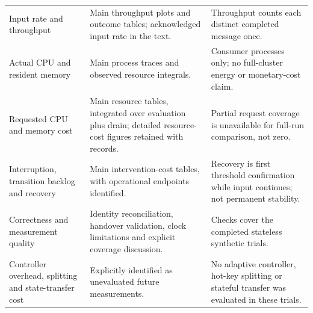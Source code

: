 \begin{longtable}{@{}>{\raggedright\arraybackslash}p{.22\linewidth}>{\raggedright\arraybackslash}p{.42\linewidth}>{\raggedright\arraybackslash}p{.29\linewidth}@{}}
Input rate and throughput & Main throughput plots and outcome tables; acknowledged input rate in the text. & Throughput counts each distinct completed message once.\\
Actual CPU and resident memory & Main process traces and observed resource integrals. & Consumer processes only; no full-cluster energy or monetary-cost claim.\\
Requested CPU and memory cost & Main resource tables, integrated over evaluation plus drain; detailed resource-cost figures retained with records. & Partial request coverage is unavailable for full-run comparison, not zero.\\
Interruption, transition backlog and recovery & Main intervention-cost tables, with operational endpoints identified. & Recovery is first threshold confirmation while input continues; not permanent stability.\\
Correctness and measurement quality & Identity reconciliation, handover validation, clock limitations and explicit coverage discussion. & Checks cover the completed stateless synthetic trials.\\
Controller overhead, splitting and state-transfer cost & Explicitly identified as unevaluated future measurements. & No adaptive controller, hot-key splitting or stateful transfer was evaluated in these trials.\\
\bottomrule
\end{longtable}
\endgroup
